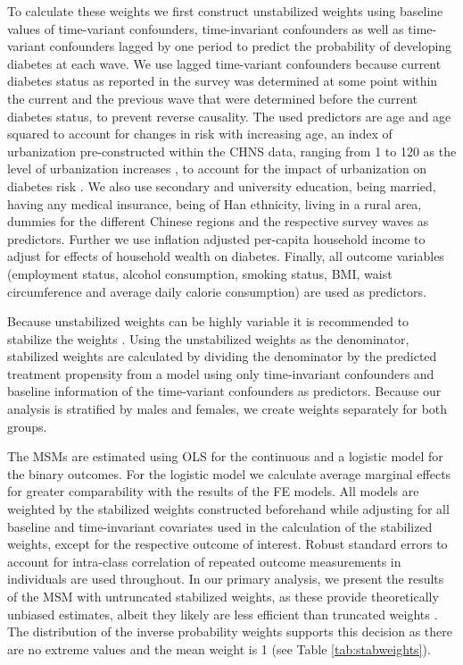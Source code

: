 To calculate these weights we first construct unstabilized weights using baseline values of time-variant confounders, time-invariant confounders as well as time-variant confounders lagged by one period to predict the probability of developing diabetes at each wave. We use lagged time-variant confounders because current diabetes status as reported in the survey was determined at some point within the current and the previous wave that were determined before the current diabetes status, to prevent reverse causality. The used predictors are age and age squared to account for changes in risk with increasing age, an index of urbanization pre-constructed within the \ac{CHNS} data, ranging from 1 to 120 as the level of urbanization increases \parencite{Zhang2014d}, to account for the impact of urbanization on diabetes risk \parencite{Attard2012}. We also use secondary and university education, being married, having any medical insurance, being of Han ethnicity, living in a rural area, dummies for the different Chinese regions and the respective survey waves as predictors. Further we use inflation adjusted per-capita household income to adjust for effects of household wealth on diabetes. Finally, all outcome variables (employment status, alcohol consumption, smoking status, \ac{BMI}, waist circumference and average daily calorie consumption) are used as predictors. 

Because unstabilized weights can be highly variable it is recommended to stabilize the weights \parencite{Cole2008}. Using the unstabilized weights as the denominator, stabilized weights are calculated by dividing the denominator by the predicted treatment propensity from a model using only time-invariant confounders and baseline information of the time-variant confounders as predictors.  Because our analysis is stratified by males and females, we create weights separately for both groups.

The \acp{MSM} are estimated using \ac{OLS} for the continuous and a logistic model for the binary outcomes. For the logistic model we calculate average marginal effects for greater comparability with the results of the \ac{FE} models. All models are weighted by the stabilized weights constructed beforehand while adjusting for all baseline and time-invariant covariates used in the calculation of the stabilized weights, except for the respective outcome of interest. Robust standard errors to account for intra-class correlation of repeated outcome measurements in individuals are used throughout. In our primary analysis, we present the results of the \ac{MSM} with untruncated stabilized weights, as these provide theoretically unbiased estimates, albeit they likely are less efficient than truncated weights \parencite{Cole2008}. The distribution of the inverse probability weights supports this decision as there are no extreme values and the mean weight is 1 (see Table \ref{tab:stabweights}).

